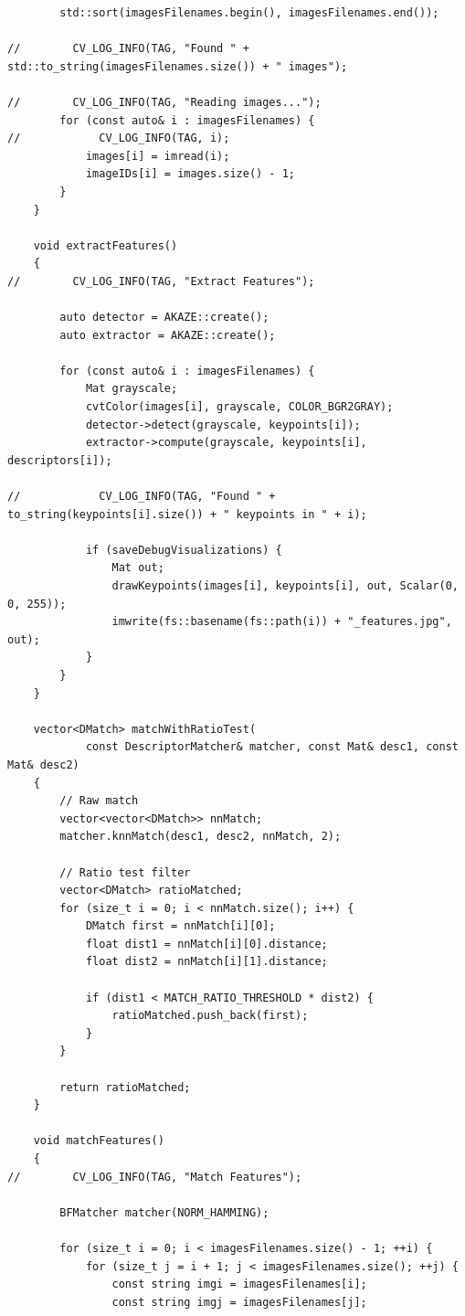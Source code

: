 \documentclass[a4paper, 12pt]{article}
\begin{document}
\begin{lstlisting}
        std::sort(imagesFilenames.begin(), imagesFilenames.end());

//        CV_LOG_INFO(TAG, "Found " + std::to_string(imagesFilenames.size()) + " images");

//        CV_LOG_INFO(TAG, "Reading images...");
        for (const auto& i : imagesFilenames) {
//            CV_LOG_INFO(TAG, i);
            images[i] = imread(i);
            imageIDs[i] = images.size() - 1;
        }
    }

    void extractFeatures()
    {
//        CV_LOG_INFO(TAG, "Extract Features");

        auto detector = AKAZE::create();
        auto extractor = AKAZE::create();

        for (const auto& i : imagesFilenames) {
            Mat grayscale;
            cvtColor(images[i], grayscale, COLOR_BGR2GRAY);
            detector->detect(grayscale, keypoints[i]);
            extractor->compute(grayscale, keypoints[i], descriptors[i]);

//            CV_LOG_INFO(TAG, "Found " + to_string(keypoints[i].size()) + " keypoints in " + i);

            if (saveDebugVisualizations) {
                Mat out;
                drawKeypoints(images[i], keypoints[i], out, Scalar(0, 0, 255));
                imwrite(fs::basename(fs::path(i)) + "_features.jpg", out);
            }
        }
    }

    vector<DMatch> matchWithRatioTest(
            const DescriptorMatcher& matcher, const Mat& desc1, const Mat& desc2)
    {
        // Raw match
        vector<vector<DMatch>> nnMatch;
        matcher.knnMatch(desc1, desc2, nnMatch, 2);

        // Ratio test filter
        vector<DMatch> ratioMatched;
        for (size_t i = 0; i < nnMatch.size(); i++) {
            DMatch first = nnMatch[i][0];
            float dist1 = nnMatch[i][0].distance;
            float dist2 = nnMatch[i][1].distance;

            if (dist1 < MATCH_RATIO_THRESHOLD * dist2) {
                ratioMatched.push_back(first);
            }
        }

        return ratioMatched;
    }

    void matchFeatures()
    {
//        CV_LOG_INFO(TAG, "Match Features");

        BFMatcher matcher(NORM_HAMMING);

        for (size_t i = 0; i < imagesFilenames.size() - 1; ++i) {
            for (size_t j = i + 1; j < imagesFilenames.size(); ++j) {
                const string imgi = imagesFilenames[i];
                const string imgj = imagesFilenames[j];


\end{lstlisting}
\end{document}
